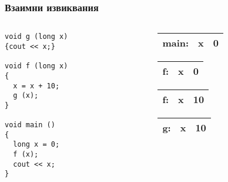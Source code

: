 \documentclass{beamer}
\begin{document}
\begin{frame}[fragile]
\frametitle{Взаимни извиквания}

\begin{columns}[t]
  \begin{column}{0.8\textwidth}
\begin{lstlisting}
void g (long x)
{cout << x;}

void f (long x)
{
  x = x + 10;
  g (x);
}

void main ()
{
  long x = 0;
  f (x);
  cout << x;
}

\end{lstlisting}
  \end{column}
  \begin{column}{0.2\textwidth}

    \begin{tabular}{c|c|c|}
    main: & x & 0 \\\hline

    \end{tabular}
    \pause
    \begin{tabular}{c|c|c|}
    f: & x & 0 \\\hline

    \end{tabular}
    \pause
    \begin{tabular}{c|c|c|}
    f: & x & 10 \\\hline

    \end{tabular}
    \pause
    \begin{tabular}{c|c|c|}
    g: & x & 10 \\\hline

    \end{tabular}


  \end{column}
\end{columns}


\end{frame}
\end{document}
